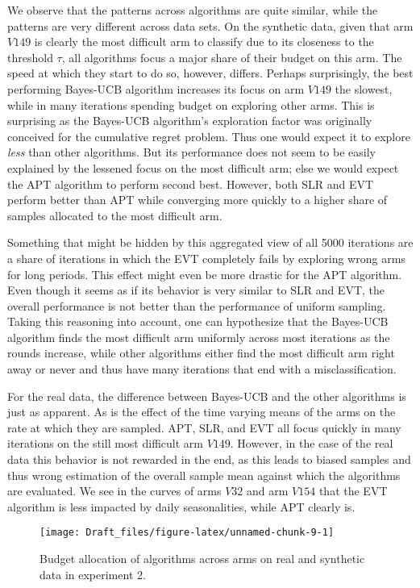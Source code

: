 \documentclass[11pt,]{article}
\begin{document}
We observe that the patterns across algorithms are quite similar, while
the patterns are very different across data sets. On the synthetic data,
given that arm \(V149\) is clearly the most difficult arm to classify
due to its closeness to the threshold \(\tau\), all algorithms focus a
major share of their budget on this arm. The speed at which they start
to do so, however, differs. Perhaps surprisingly, the best performing
Bayes-UCB algorithm increases its focus on arm \(V149\) the slowest,
while in many iterations spending budget on exploring other arms. This
is surprising as the Bayes-UCB algorithm's exploration factor was
originally conceived for the cumulative regret problem. Thus one would
expect it to explore \emph{less} than other algorithms. But its
performance does not seem to be easily explained by the lessened focus
on the most difficult arm; else we would expect the APT algorithm to
perform second best. However, both SLR and EVT perform better than APT
while converging more quickly to a higher share of samples allocated to
the most difficult arm.

Something that might be hidden by this aggregated view of all 5000
iterations are a share of iterations in which the EVT completely fails
by exploring wrong arms for long periods. This effect might even be more
drastic for the APT algorithm. Even though it seems as if its behavior
is very similar to SLR and EVT, the overall performance is not better
than the performance of uniform sampling. Taking this reasoning into
account, one can hypothesize that the Bayes-UCB algorithm finds the most
difficult arm uniformly across most iterations as the rounds increase,
while other algorithms either find the most difficult arm right away or
never and thus have many iterations that end with a misclassification.

For the real data, the difference between Bayes-UCB and the other
algorithms is just as apparent. As is the effect of the time varying
means of the arms on the rate at which they are sampled. APT, SLR, and
EVT all focus quickly in many iterations on the still most difficult arm
\(V149\). However, in the case of the real data this behavior is not
rewarded in the end, as this leads to biased samples and thus wrong
estimation of the overall sample mean against which the algorithms are
evaluated. We see in the curves of arms \(V32\) and arm \(V154\) that
the EVT algorithm is less impacted by daily seasonalities, while APT
clearly is.

\begin{figure}

{\centering \texttt{[image: Draft\_files/figure-latex/unnamed-chunk-9-1]} 

}

\caption{Budget allocation of algorithms across arms on real and synthetic data in experiment 2.}\label{fig:unnamed-chunk-9}
\end{figure}
\end{document}
